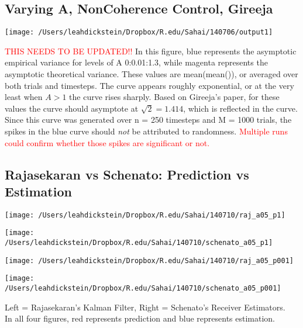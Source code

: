 \documentclass[leqno,twocolumn]{article}
\begin{document}
\subsection{Varying A, NonCoherence Control, Gireeja}
\begin{minipage}[c]{0.5\textwidth}
\texttt{[image: /Users/leahdickstein/Dropbox/R.edu/Sahai/140706/output1]}
\end{minipage}
\begin{minipage}[b]{0.5\textwidth}
\textcolor{red}{THIS NEEDS TO BE UPDATED!!} In this figure, blue represents the asymptotic empirical variance for levels of A 0:0.01:1.3, while magenta represents the asymptotic theoretical variance. These values are mean(mean()), or averaged over both trials and timesteps. The curve appears roughly exponential, or at the very least when $A > 1$ the curve rises sharply. Based on Gireeja's paper, for these values the curve should asymptote at $\sqrt{2} = 1.414$, which is reflected in the curve. Since this curve was generated over n = 250 timesteps and M = 1000 trials, the spikes in the blue curve should \textit{not} be attributed to randomness. \textcolor{red}{Multiple runs could confirm whether those spikes are significant or not.}
\end{minipage}

\subsection{Rajasekaran vs Schenato: Prediction vs Estimation}
\begin{minipage}[c]{0.5\textwidth}
\texttt{[image: /Users/leahdickstein/Dropbox/R.edu/Sahai/140710/raj\_a05\_p1]}
\end{minipage}
\begin{minipage}[c]{0.5\textwidth}
\texttt{[image: /Users/leahdickstein/Dropbox/R.edu/Sahai/140710/schenato\_a05\_p1]}
\end{minipage}

\begin{minipage}[c]{0.5\textwidth}
\texttt{[image: /Users/leahdickstein/Dropbox/R.edu/Sahai/140710/raj\_a05\_p001]}
\end{minipage}
\begin{minipage}[c]{0.5\textwidth}
\texttt{[image: /Users/leahdickstein/Dropbox/R.edu/Sahai/140710/schenato\_a05\_p001]}
\end{minipage}

Left = Rajasekaran's Kalman Filter, Right = Schenato's Receiver Estimators.\\
In all four figures, red represents prediction and blue represents estimation. 
\end{document}
